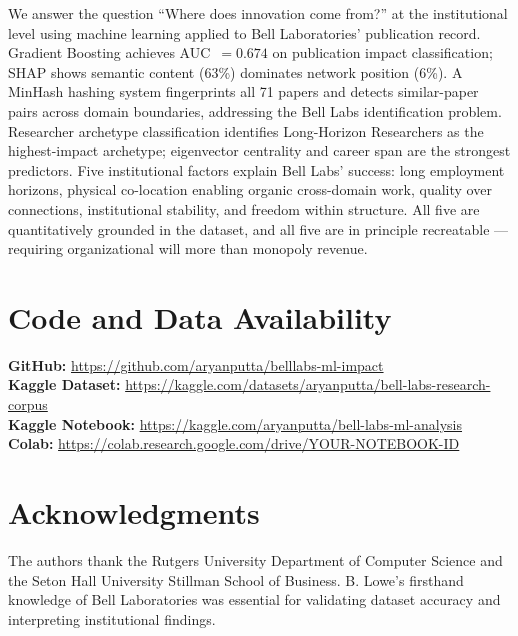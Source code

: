 \documentclass[journal]{IEEEtran}
\begin{document}
We answer the question ``Where does innovation come from?'' at the institutional
level using machine learning applied to Bell Laboratories' publication record.
Gradient Boosting achieves AUC~$= 0.674$ on publication impact classification;
SHAP shows semantic content (63\%) dominates network position (6\%). A MinHash
hashing system fingerprints all 71 papers and detects similar-paper pairs
across domain boundaries, addressing the Bell Labs identification problem.
Researcher archetype classification identifies Long-Horizon Researchers as
the highest-impact archetype; eigenvector centrality and career span are the
strongest predictors. Five institutional factors explain Bell Labs' success:
long employment horizons, physical co-location enabling organic cross-domain
work, quality over connections, institutional stability, and freedom within
structure. All five are quantitatively grounded in the dataset, and all five
are in principle recreatable --- requiring organizational will more than
monopoly revenue.

\section*{Code and Data Availability}
\noindent\textbf{GitHub:} \url{https://github.com/aryanputta/belllabs-ml-impact}\\
\textbf{Kaggle Dataset:} \url{https://kaggle.com/datasets/aryanputta/bell-labs-research-corpus}\\
\textbf{Kaggle Notebook:} \url{https://kaggle.com/aryanputta/bell-labs-ml-analysis}\\
\textbf{Colab:} \url{https://colab.research.google.com/drive/YOUR-NOTEBOOK-ID}

\section*{Acknowledgments}
The authors thank the Rutgers University Department of Computer Science and
the Seton Hall University Stillman School of Business. B. Lowe's firsthand
knowledge of Bell Laboratories was essential for validating dataset accuracy
and interpreting institutional findings.
\end{document}
